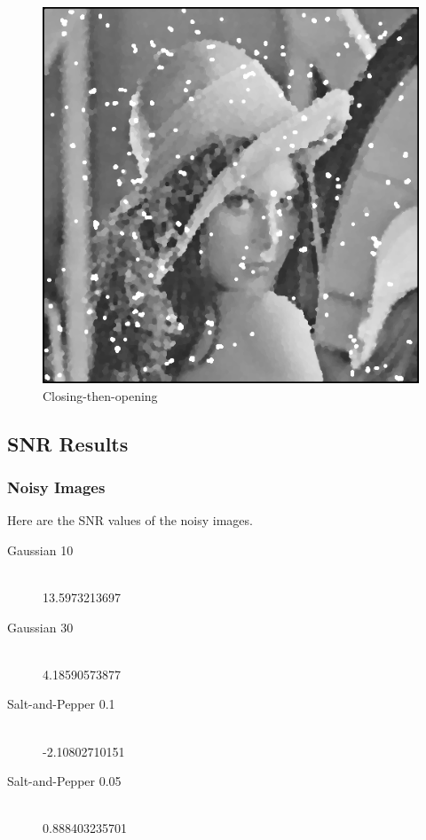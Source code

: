 \documentclass{article}
\begin{document}
\begin{figure}[H]
  \includegraphics[width=\linewidth]{img/snp5_close_then_open.png}
  \caption{Closing-then-opening}\label{fig:snp5_close_then_open}
\endminipage\hfill
\end{figure}

\subsection{SNR Results}

\subsubsection{Noisy Images}
Here are the SNR values of the noisy images.
\begin{description}
  \item[Gaussian 10] \hfill \\
  13.5973213697
  \item[Gaussian 30] \hfill \\
  4.18590573877
  \item[Salt-and-Pepper 0.1] \hfill \\
  -2.10802710151
  \item[Salt-and-Pepper 0.05] \hfill \\
  0.888403235701
\end{description}
\end{document}
